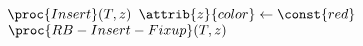 \begin{codebox}
\li $\proc{Insert}(T,z)$
\li $\attrib{z}{color} \gets \const{red}$
\li $\proc{RB-Insert-Fixup}(T,z)$
\end{codebox}